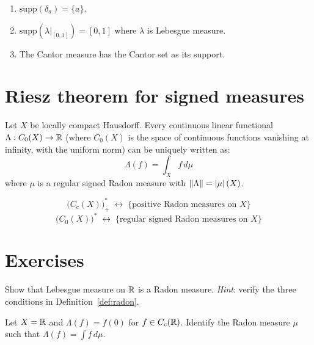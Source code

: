 \begin{example}
\begin{enumerate}
    \item $\mathrm{supp}(\delta_a) = \{a\}$.
    \item $\mathrm{supp}(\lambda|_{[0,1]}) = [0,1]$ where $\lambda$ is Lebesgue measure.
    \item The Cantor measure has the Cantor set as its support.
\end{enumerate}
\end{example}

\section{Riesz theorem for signed measures}

\begin{theorem}
\label{thm:riesz_signed}
Let $X$ be locally compact Hausdorff. Every continuous linear functional
$\Lambda : C_0(X) \to \mathbb{R}$ (where $C_0(X)$ is the space of continuous functions
vanishing at infinity, with the uniform norm) can be uniquely written as:
\[
    \Lambda(f) = \int_X f\, d\mu
\]
where $\mu$ is a regular signed Radon measure with $\left\| \Lambda \right\| = \left| \mu \right|(X)$.
\end{theorem}

\begin{keyformulas}[title=\textbf{Riesz correspondence}]
\[
\boxed{
    \bigl(C_c(X)\bigr)^*_+ \;\longleftrightarrow\;
    \{\text{positive Radon measures on } X\}
}
\]
\[
\boxed{
    \bigl(C_0(X)\bigr)^* \;\longleftrightarrow\;
    \{\text{regular signed Radon measures on } X\}
}
\]
\end{keyformulas}

\section{Exercises}

\begin{exercise}
Show that Lebesgue measure on $\mathbb{R}$ is a Radon measure.
\emph{Hint}: verify the three conditions in Definition~\ref{def:radon}.
\end{exercise}

\begin{exercise}
Let $X = \mathbb{R}$ and $\Lambda(f) = f(0)$ for $f \in C_c(\mathbb{R})$. Identify the Radon measure
$\mu$ such that $\Lambda(f) = \int f\, d\mu$.
\end{exercise}

